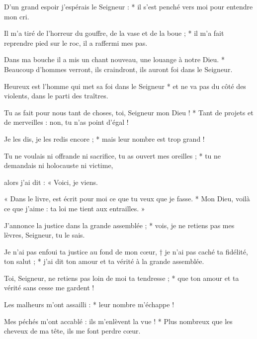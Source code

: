 \item D'un grand espoir j'espérais le Seigneur : * il s'est penché vers moi pour entendre mon cri.

\item Il m'a tiré de l'horreur du gouffre, de la vase et de la boue ; * il m'a fait reprendre pied sur le roc, il a raffermi mes pas.

\item Dans ma bouche il a mis un chant nouveau, une louange à notre Dieu. * Beaucoup d'hommes verront, ils craindront, ils auront foi dans le Seigneur.

\item Heureux est l'homme qui met sa foi dans le Seigneur * et ne va pas du côté des violents, dans le parti des traîtres.

\item Tu as fait pour nous tant de choses, toi, Seigneur mon Dieu ! * Tant de projets et de merveilles : non, tu n'as point d'égal ! 

\item Je les dis, je les redis encore ; * mais leur nombre est trop grand !

\item Tu ne voulais ni offrande ni sacrifice, tu as ouvert mes oreilles ; * tu ne demandais ni holocauste ni victime,

\item alors j'ai dit : « Voici, je viens.

\item « Dans le livre, est écrit pour moi ce que tu veux que je fasse. * Mon Dieu, voilà ce que j'aime : ta loi me tient aux entrailles. »

\item J'annonce la justice dans la grande assemblée ; * vois, je ne retiens pas mes lèvres, Seigneur, tu le sais.

\item Je n'ai pas enfoui ta justice au fond de mon cœur, † je n'ai pas caché ta fidélité, ton salut ; * j'ai dit ton amour et ta vérité à la grande assemblée.

\item Toi, Seigneur, ne retiens pas loin de moi ta tendresse ; * que ton amour et ta vérité sans cesse me gardent !

\item Les malheurs m'ont assailli : * leur nombre m'échappe ! 

\item Mes péchés m'ont accablé : ils m'enlèvent la vue ! * Plus nombreux que les cheveux de ma tête, ils me font perdre cœur.

